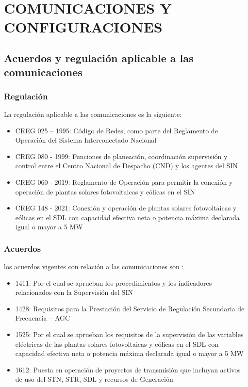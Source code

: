 \documentclass[a5paper]{book}%
\begin{document}
\chapter{COMUNICACIONES Y CONFIGURACIONES}

\section{Acuerdos y regulación aplicable a las comunicaciones}

\subsection{Regulación}
La regulación aplicable a las comunicaciones es la siguiente:

\begin{itemize}
\item CREG 025 – 1995: Código de Redes, como parte del Reglamento de Operación del Sistema Interconectado Nacional
\item CREG 080 - 1999: Funciones de planeación, coordinación supervisión y control entre el Centro Nacional de Despacho (CND) y los agentes del SIN
\item CREG 060 - 2019: Reglamento de Operación para permitir la conexión y operación de plantas solares fotovoltaicas y eólicas en el SIN
\item CREG 148 - 2021: Conexión y operación de plantas solares fotovoltaicas y eólicas en el SDL con capacidad efectiva neta o potencia máxima declarada igual o mayor a 5 MW
\end{itemize}

\subsection{Acuerdos}

los acuerdos vigentes con relación a las comunicaciones son :

\begin{itemize}
\item 1411: Por el cual se aprueban los procedimientos y los indicadores relacionados con la Supervisión del SIN
\item 1428: Requisitos para la Prestación del Servicio de Regulación Secundaria de Frecuencia – AGC
\item 1525: Por el cual se aprueban los requisitos de la supervisión de las variables eléctricas de las plantas solares fotovoltaicas y eólicas en el SDL con capacidad efectiva neta o potencia máxima declarada igual o mayor a 5 MW
\item 1612: Puesta en operación de proyectos de transmisión que incluyan activos de uso del STN, STR, SDL y recursos de Generación
  \end{itemize}
\end{document}
